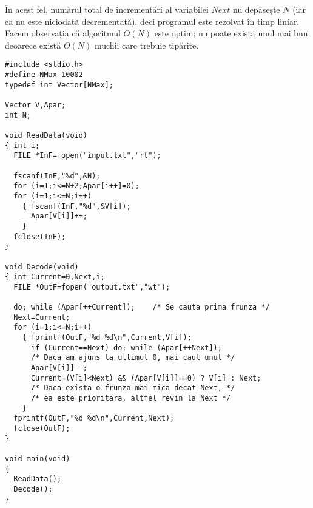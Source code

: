 În acest fel, numărul total de incrementări al variabilei $Next$ nu depășește
$N$ (iar ea nu este niciodată decrementată), deci programul este rezolvat în
timp liniar. Facem observația că algoritmul $O(N)$ este optim; nu poate exista
unul mai bun deoarece există $O(N)$ muchii care trebuie tipărite.

\begin{verbatim}
#include <stdio.h>
#define NMax 10002
typedef int Vector[NMax];

Vector V,Apar;
int N;

void ReadData(void)
{ int i;
  FILE *InF=fopen("input.txt","rt");

  fscanf(InF,"%d",&N);
  for (i=1;i<=N+2;Apar[i++]=0);
  for (i=1;i<=N;i++)
    { fscanf(InF,"%d",&V[i]);
      Apar[V[i]]++;
    }
  fclose(InF);
}

void Decode(void)
{ int Current=0,Next,i;
  FILE *OutF=fopen("output.txt","wt");

  do; while (Apar[++Current]);    /* Se cauta prima frunza */
  Next=Current;
  for (i=1;i<=N;i++)
    { fprintf(OutF,"%d %d\n",Current,V[i]);
      if (Current==Next) do; while (Apar[++Next]);
      /* Daca am ajuns la ultimul 0, mai caut unul */
      Apar[V[i]]--;
      Current=(V[i]<Next) && (Apar[V[i]]==0) ? V[i] : Next;
      /* Daca exista o frunza mai mica decat Next, */
      /* ea este prioritara, altfel revin la Next */
    }
  fprintf(OutF,"%d %d\n",Current,Next);
  fclose(OutF);
}

void main(void)
{
  ReadData();
  Decode();
}
\end{verbatim}
